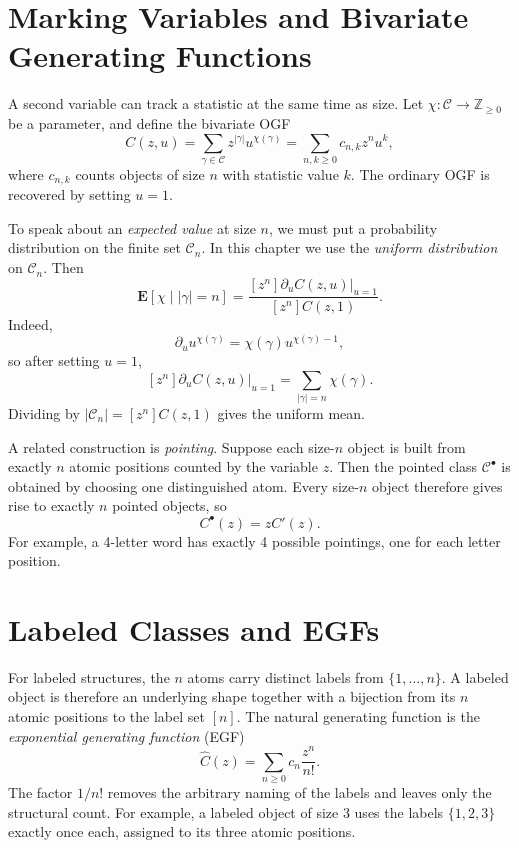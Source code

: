 \section{Marking Variables and Bivariate Generating Functions}

A second variable can track a statistic at the same time as size. Let $\chi : \mathcal{C} \to \mathbb{Z}_{\ge 0}$ be a parameter, and define the bivariate OGF
\[
  C(z,u) = \sum_{\gamma \in \mathcal{C}} z^{|\gamma|}u^{\chi(\gamma)} = \sum_{n,k \ge 0} c_{n,k} z^n u^k,
\]
where $c_{n,k}$ counts objects of size $n$ with statistic value $k$. The ordinary OGF is recovered by setting $u=1$.

To speak about an \emph{expected value} at size $n$, we must put a probability distribution on the finite set $\mathcal{C}_n$. In this chapter we use the \emph{uniform distribution} on $\mathcal{C}_n$. Then
\[
  \mathbf{E}[\chi \mid |\gamma|=n]
  = \frac{[z^n] \partial_u C(z,u)\big|_{u=1}}{[z^n] C(z,1)}.
\]
Indeed,
\[
  \partial_u u^{\chi(\gamma)} = \chi(\gamma)u^{\chi(\gamma)-1},
\]
so after setting $u=1$,
\[
  [z^n] \partial_u C(z,u)\big|_{u=1} = \sum_{|\gamma|=n} \chi(\gamma).
\]
Dividing by $|\mathcal{C}_n| = [z^n]C(z,1)$ gives the uniform mean.

A related construction is \emph{pointing}. Suppose each size-$n$ object is built from exactly $n$ atomic positions counted by the variable $z$. Then the pointed class $\mathcal{C}^{\bullet}$ is obtained by choosing one distinguished atom. Every size-$n$ object therefore gives rise to exactly $n$ pointed objects, so
\[
  C^{\bullet}(z) = zC'(z).
\]
For example, a 4-letter word has exactly 4 possible pointings, one for each letter position.

\section{Labeled Classes and EGFs}

For labeled structures, the $n$ atoms carry distinct labels from $\{1,\dots,n\}$. A labeled object is therefore an underlying shape together with a bijection from its $n$ atomic positions to the label set $[n]$. The natural generating function is the \emph{exponential generating function} (EGF)
\[
  \hat{C}(z) = \sum_{n \ge 0} c_n \frac{z^n}{n!}.
\]
The factor $1/n!$ removes the arbitrary naming of the labels and leaves only the structural count.
For example, a labeled object of size $3$ uses the labels $\{1,2,3\}$ exactly once each, assigned to its three atomic positions.

